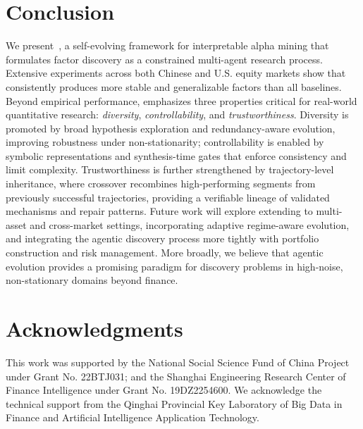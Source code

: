 \section{Conclusion}

We present~\method, a self-evolving framework for interpretable alpha mining that formulates factor discovery as a constrained multi-agent research process. Extensive experiments across both Chinese and U.S. equity markets show that \method consistently produces more stable and generalizable factors than all baselines. Beyond empirical performance, \method emphasizes three properties critical for real-world quantitative research: \emph{diversity}, \emph{controllability}, and \emph{trustworthiness}. Diversity is promoted by broad hypothesis exploration and redundancy-aware evolution, improving robustness under non-stationarity; controllability is enabled by symbolic representations and synthesis-time gates that enforce consistency and limit complexity. Trustworthiness is further strengthened by trajectory-level inheritance, where crossover recombines high-performing segments from previously successful trajectories, providing a verifiable lineage of validated mechanisms and repair patterns. Future work will explore extending \method to multi-asset and cross-market settings, incorporating adaptive regime-aware evolution, and integrating the agentic discovery process more tightly with portfolio construction and risk management. More broadly, we believe that agentic evolution provides a promising paradigm for discovery problems in high-noise, non-stationary domains beyond finance.


\section*{Acknowledgments}
This work was supported by the National Social Science Fund of China Project under Grant No. 22BTJ031; and the Shanghai Engineering Research Center of Finance Intelligence under Grant No. 19DZ2254600. We acknowledge the technical support from the Qinghai Provincial Key Laboratory of Big Data in Finance and Artificial Intelligence Application Technology. 